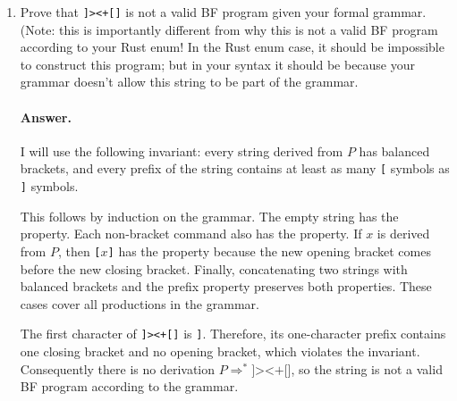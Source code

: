\documentclass{article}
\begin{document}
\begin{enumerate}
\begin{enumerate}
\paragraph{Answer.}
Let the terminal alphabet be
\[
\Sigma = \{\texttt{>},\texttt{<},\texttt{+},\texttt{-},
          \texttt{.},\texttt{,},\texttt{[},\texttt{]}\}.
\]
I use two nonterminals: $P$ for a complete program and $C$ for one
command.  The start symbol is $P$, and the productions are
\[
\begin{aligned}
P &::= \epsilon \mid C\,P,\\
C &::= \texttt{>} \mid \texttt{<} \mid \texttt{+} \mid \texttt{-}
      \mid \texttt{.} \mid \texttt{,} \mid \texttt{[}\,P\,\texttt{]}.
\end{aligned}
\]
Here $\epsilon$ is the empty program.  The production $P ::= C P$
corresponds to the \texttt{Sequence(Vec<BFProg>)} case in my Rust code,
and $C ::= \texttt{[}P\texttt{]}$ corresponds to
\texttt{Loop(Box<BFProg>)}.  In particular, the grammar has no production
for a left or right bracket by itself, just as my Rust enum has no variant
for a standalone bracket.

\item
Prove that \texttt{]><+[]} is not a valid BF program given your formal grammar.
(Note: this is importantly different from why this is not a valid BF program according to your Rust enum!
In the Rust enum case, it should be impossible to construct this program; but in your syntax it should be because
your grammar doesn't allow this string to be part of the grammar.

\paragraph{Answer.}
I will use the following invariant: every string derived from $P$ has
balanced brackets, and every prefix of the string contains at least as many
\texttt{[} symbols as \texttt{]} symbols.

This follows by induction on the grammar.  The empty string has the
property.  Each non-bracket command also has the property.  If $x$ is
derived from $P$, then \texttt{[}$x$\texttt{]} has the property because the
new opening bracket comes before the new closing bracket.  Finally,
concatenating two strings with balanced brackets and the prefix property
preserves both properties.  These cases cover all productions in the
grammar.

The first character of \texttt{]><+[]} is \texttt{]}.  Therefore, its
one-character prefix contains one closing bracket and no opening bracket,
which violates the invariant.  Consequently there is no derivation
$P \Rightarrow^* \texttt{]><+[]}$, so the string is not a valid BF program
according to the grammar.


\end{enumerate}
\end{enumerate}
\end{document}
